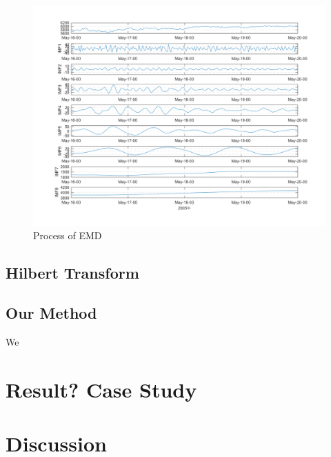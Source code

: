 \documentclass[draft]{agujournal2019}
\begin{document}
\begin{figure}[h]
      \centering
      \includegraphics[width=350pt]{img//ceemdan2.png}
      \caption{Process of EMD}\label{fig:6}
      \end{figure}

\subsection{Hilbert Transform}

\subsection{Our Method}
We
\section{Result? Case Study}

\section{Discussion}


\end{document}
